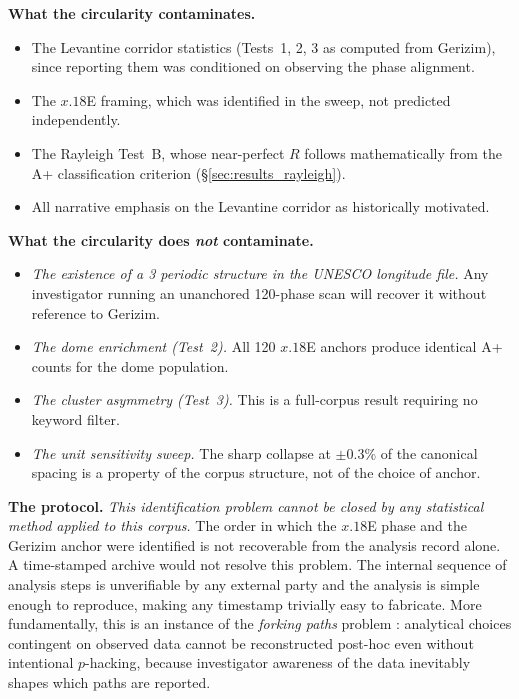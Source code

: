 \documentclass[12pt,a4paper]{article}
\begin{document}
\textbf{What the circularity contaminates.}
\begin{itemize}
  \item The Levantine corridor statistics (Tests~1, 2, 3 as computed from
    Gerizim), since reporting them was conditioned on observing the
    phase alignment.
  \item The $x.18$\textdegree{}E framing, which was identified in the sweep,
    not predicted independently.
  \item The Rayleigh Test~B, whose near-perfect $R$ follows mathematically
    from the A+ classification criterion (\S\ref{sec:results_rayleigh}).
  \item All narrative emphasis on the Levantine corridor as historically
    motivated.
\end{itemize}

\textbf{What the circularity does \emph{not} contaminate.}
\begin{itemize}
  \item \emph{The existence of a 3\textdegree{} periodic structure in the
    UNESCO longitude file.}
    Any investigator running an unanchored 120-phase scan will recover it
    without reference to Gerizim.
  \item \emph{The dome enrichment (Test~2).}
    All 120 $x.18$\textdegree{}E anchors produce identical A+ counts for
    the dome population.
  \item \emph{The cluster asymmetry (Test~3).}
    This is a full-corpus result requiring no keyword filter.
  \item \emph{The unit sensitivity sweep.}
    The sharp collapse at $\pm 0.3\%$ of the canonical spacing is a
    property of the corpus structure, not of the choice of anchor.
\end{itemize}

\textbf{The protocol.}
\emph{This identification problem cannot be closed by any statistical method
applied to this corpus.}
The order in which the $x.18$\textdegree{}E phase and the Gerizim anchor
were identified is not recoverable from the analysis record alone. A
time-stamped archive would not resolve this problem. The internal sequence of
analysis steps is unverifiable by any external party and the analysis is
simple enough to reproduce, making any timestamp trivially easy to fabricate.
More fundamentally, this is an instance of the \emph{forking paths} problem
\citep{gelman2014forking}: analytical choices contingent on observed data
cannot be reconstructed post-hoc even without intentional $p$-hacking,
because investigator awareness of the data inevitably shapes which paths
are reported.
\end{document}
